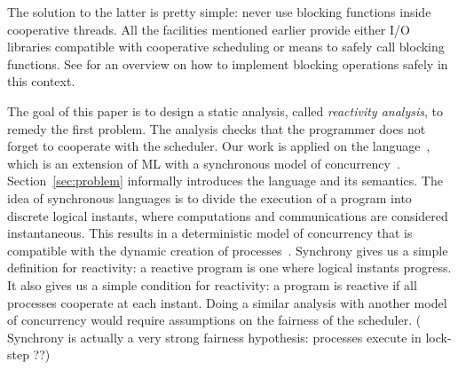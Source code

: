 \documentclass[9pt,preprint]{sigplanconf}
\newcommand{\todo}[1]{ {\color{red} #1}}
\begin{document}

The solution to the latter is pretty simple: never use blocking functions inside cooperative threads. All the facilities mentioned earlier provide either I/O libraries compatible with cooperative scheduling or means to safely call blocking functions. See \cite{Marlow:2004} for an overview on how to implement blocking operations safely in this context.


The goal of this paper is to design a static analysis, called \emph{reactivity analysis}, to remedy the first problem. The analysis checks that the programmer does not forget to cooperate with the scheduler.
%
Our work is applied on the \rml language~\cite{Mandel:2005}, which is an extension of ML with a synchronous model of concurrency~\cite{Benveniste:2003}. Section~\ref{sec:problem} informally introduces the language and its semantics. The idea of synchronous languages is to divide the execution of a program into discrete logical instants, where computations and communications are considered instantaneous. This results in a deterministic model of concurrency that is compatible with the dynamic creation of processes~\cite{Boussinot:1991}.  Synchrony gives us a simple definition for reactivity: a reactive \rml program is one where logical instants progress. It also gives us a simple condition for reactivity: a program is reactive if all processes cooperate at each instant. Doing a similar analysis with another model of concurrency would require assumptions on the fairness of the scheduler. (\todo{Synchrony is actually a very strong fairness hypothesis: processes execute in lock-step ??})
\end{document}
